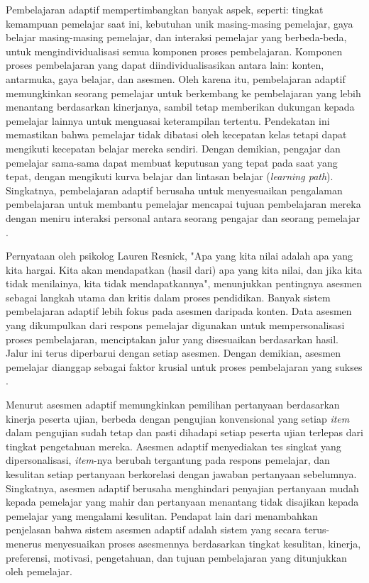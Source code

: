 Pembelajaran adaptif mempertimbangkan banyak aspek, seperti: tingkat kemampuan pemelajar saat ini, kebutuhan unik masing-masing pemelajar, gaya belajar masing-masing pemelajar, dan interaksi pemelajar yang berbeda-beda, untuk mengindividualisasi semua komponen proses pembelajaran. Komponen proses pembelajaran yang dapat diindividualisasikan antara lain: konten, antarmuka, gaya belajar, dan asesmen. Oleh karena itu, pembelajaran adaptif memungkinkan seorang pemelajar untuk berkembang ke pembelajaran yang lebih menantang berdasarkan kinerjanya, sambil tetap memberikan dukungan kepada pemelajar lainnya untuk menguasai keterampilan tertentu. Pendekatan ini memastikan bahwa pemelajar tidak dibatasi
oleh kecepatan kelas tetapi dapat mengikuti kecepatan belajar mereka sendiri.
Dengan demikian, pengajar dan pemelajar sama-sama dapat membuat keputusan yang tepat pada saat yang tepat, dengan mengikuti kurva belajar dan lintasan belajar (\textit{learning path}). Singkatnya, pembelajaran adaptif berusaha untuk menyesuaikan pengalaman pembelajaran untuk membantu pemelajar mencapai tujuan pembelajaran mereka dengan meniru interaksi personal antara seorang pengajar dan
seorang pemelajar \autocite{Ihichr2024}.

Pernyataan oleh psikolog Lauren Resnick, "Apa yang kita nilai adalah apa yang kita hargai. Kita akan mendapatkan (hasil dari) apa yang kita nilai, dan jika kita tidak menilainya, kita tidak mendapatkannya", menunjukkan pentingnya asesmen sebagai langkah utama dan kritis dalam proses pendidikan. Banyak sistem pembelajaran adaptif lebih fokus
pada asesmen daripada konten. Data asesmen yang dikumpulkan dari respons pemelajar digunakan untuk mempersonalisasi proses pembelajaran, menciptakan jalur yang disesuaikan berdasarkan hasil. Jalur ini terus diperbarui dengan setiap asesmen.
Dengan demikian, asesmen pemelajar dianggap sebagai faktor krusial untuk proses pembelajaran yang sukses \autocite{Ihichr2024}.

Menurut \textcite{Ihichr2024} asesmen adaptif memungkinkan pemilihan pertanyaan berdasarkan kinerja peserta
ujian, berbeda dengan pengujian konvensional yang setiap \textit{item} dalam pengujian sudah tetap dan pasti dihadapi setiap peserta ujian terlepas dari tingkat pengetahuan mereka. Asesmen adaptif menyediakan tes
singkat yang dipersonalisasi, \textit{item}-nya berubah tergantung pada respons
pemelajar, dan kesulitan setiap pertanyaan berkorelasi dengan jawaban pertanyaan
sebelumnya. Singkatnya, asesmen adaptif berusaha menghindari penyajian pertanyaan
mudah kepada pemelajar yang mahir dan
pertanyaan menantang tidak disajikan kepada pemelajar yang mengalami kesulitan. Pendapat lain dari \textcite{Halkiopoulos2024} menambahkan penjelasan bahwa sistem asesmen adaptif adalah sistem yang secara terus-menerus menyesuaikan proses asesmennya berdasarkan tingkat kesulitan, kinerja, preferensi, motivasi, pengetahuan, dan tujuan pembelajaran yang ditunjukkan oleh pemelajar.

